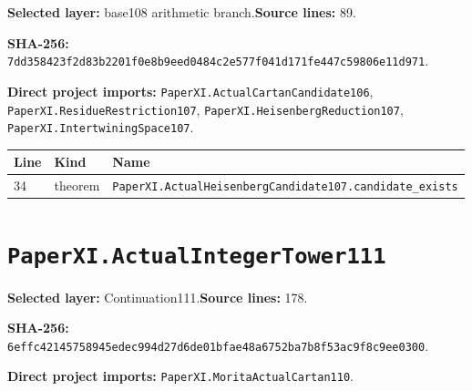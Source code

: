 \documentclass[10pt,oneside]{book}
\begin{document}
\textbf{Selected layer:} base108 arithmetic branch.\quad\textbf{Source lines:} 89.\par\textbf{SHA-256:} {\scriptsize\nolinkurl{7dd358423f2d83b2201f0e8b9eed0484c2e577f041d171fe447c59806e11d971}}.


\textbf{Direct project imports:} \nolinkurl{PaperXI.ActualCartanCandidate106}, \nolinkurl{PaperXI.ResidueRestriction107}, \nolinkurl{PaperXI.HeisenbergReduction107}, \nolinkurl{PaperXI.IntertwiningSpace107}.

\begin{longtable}{@{}p{}p{}p{}@{}}\toprule Line&Kind&Name\\\midrule\endhead

34&theorem&\nolinkurl{PaperXI.ActualHeisenbergCandidate107.candidate_exists}\\

\bottomrule\end{longtable}

\section{\texorpdfstring{\nolinkurl{PaperXI.ActualIntegerTower111}}{PaperXI.ActualIntegerTower111}}\label{module:PaperXI.ActualIntegerTower111}

\textbf{Selected layer:} Continuation111.\quad\textbf{Source lines:} 178.\par\textbf{SHA-256:} {\scriptsize\nolinkurl{6effc42145758945edec994d27d6de01bfae48a6752ba7b8f53ac9f8c9ee0300}}.


\textbf{Direct project imports:} \nolinkurl{PaperXI.MoritaActualCartan110}.
\end{document}
